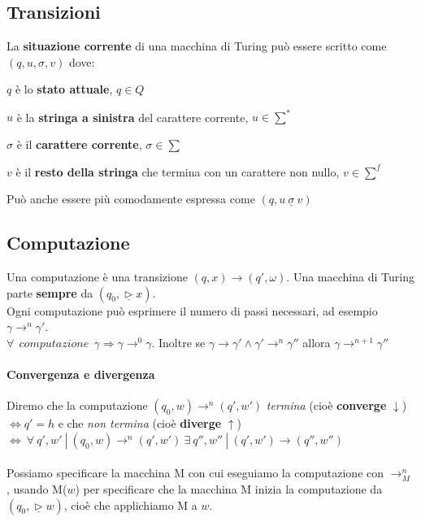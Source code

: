 \documentclass[10pt]{book}
\begin{document}
\subsection{Transizioni}
La \textbf{situazione corrente} di una macchina di Turing può essere scritto come $(q, u, \sigma, v)$ dove:
\begin{list}{}{}
	\item $q$ è lo \textbf{stato attuale}, $q \in Q$
	\item $u$ è la \textbf{stringa a sinistra} del carattere corrente, $u \in \sum^*$
	\item $\sigma$ è il \textbf{carattere corrente}, $\sigma \in \sum$
	\item $v$ è il \textbf{resto della stringa} che termina con un carattere non nullo, $v \in \sum^f$
\end{list}
Può anche essere più comodamente espressa come $(q, u \:\underline{\sigma}\: v)$

\subsection{Computazione}
Una computazione è una transizione $(q, x) \longrightarrow (q', \omega)$. Una macchina di Turing parte \textbf{sempre} da $(q_0, \underline{\triangleright} x)$.\\
Ogni computazione può esprimere il numero di passi necessari, ad esempio $\gamma \longrightarrow^n \gamma'$.\\
$\forall \:\:computazione\:\: \gamma \Rightarrow \gamma \longrightarrow^0 \gamma$. Inoltre se $\gamma \longrightarrow \gamma' \wedge \gamma' \longrightarrow^n \gamma''$ allora $\gamma \longrightarrow^{n+1} \gamma''$
\paragraph{Convergenza e divergenza} Diremo che la computazione $(q_0, w)\rightarrow^n(q',w')$ \textit{termina} (cioè \textbf{converge} $\downarrow$) $\Leftrightarrow q' = h$ e che \textit{non termina} (cioè \textbf{diverge} $\uparrow$) $\Leftrightarrow\:\forall\:q', w'\:|\:(q_0, w) \rightarrow^n (q', w')\:\exists\: q'', w''\:|\:(q', w')\rightarrow(q'', w'')$\\\\
Possiamo specificare la macchina M con cui eseguiamo la computazione con $\rightarrow^n_M$, usando M($w$) per specificare che la macchina M inizia la computazione da $(q_0,\underline{\triangleright}w)$, cioè che applichiamo M a $w$.
\end{document}

